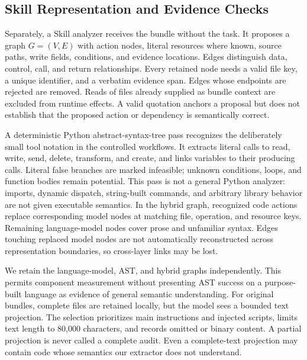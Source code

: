 \subsection{Skill Representation and Evidence Checks}
Separately, a Skill analyzer receives the bundle without the task. It proposes a graph $G=(V,E)$ with action nodes, literal resources where known, source paths, write fields, conditions, and evidence locations. Edges distinguish data, control, call, and return relationships. Every retained node needs a valid file key, a unique identifier, and a verbatim evidence span. Edges whose endpoints are rejected are removed. Reads of files already supplied as bundle context are excluded from runtime effects. A valid quotation anchors a proposal but does not establish that the proposed action or dependency is semantically correct.

A deterministic Python abstract-syntax-tree pass recognizes the deliberately small tool notation in the controlled workflows. It extracts literal calls to read, write, send, delete, transform, and create, and links variables to their producing calls. Literal false branches are marked infeasible; unknown conditions, loops, and function bodies remain potential. This pass is not a general Python analyzer: imports, dynamic dispatch, string-built commands, and arbitrary library behavior are not given executable semantics. In the hybrid graph, recognized code actions replace corresponding model nodes at matching file, operation, and resource keys. Remaining language-model nodes cover prose and unfamiliar syntax. Edges touching replaced model nodes are not automatically reconstructed across representation boundaries, so cross-layer links may be lost.

We retain the language-model, AST, and hybrid graphs independently. This permits component measurement without presenting AST success on a purpose-built language as evidence of general semantic understanding. For original bundles, complete files are retained locally, but the model sees a bounded text projection. The selection prioritizes main instructions and injected scripts, limits text length to 80,000 characters, and records omitted or binary content. A partial projection is never called a complete audit. Even a complete-text projection may contain code whose semantics our extractor does not understand.


